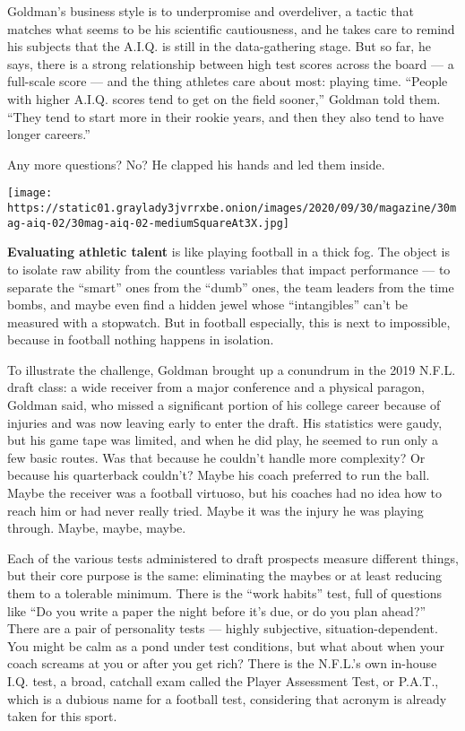 Goldman's business style is to underpromise and overdeliver, a tactic
that matches what seems to be his scientific cautiousness, and he takes
care to remind his subjects that the A.I.Q. is still in the
data-gathering stage. But so far, he says, there is a strong
relationship between high test scores across the board --- a full-scale
score --- and the thing athletes care about most: playing time. ``People
with higher A.I.Q. scores tend to get on the field sooner,'' Goldman
told them. ``They tend to start more in their rookie years, and then
they also tend to have longer careers.''

Any more questions? No? He clapped his hands and led them inside.

\texttt{[image: https://static01.graylady3jvrrxbe.onion/images/2020/09/30/magazine/30mag-aiq-02/30mag-aiq-02-mediumSquareAt3X.jpg]}

\textbf{Evaluating athletic talent} is like playing football in a thick
fog. The object is to isolate raw ability from the countless variables
that impact performance --- to separate the ``smart'' ones from the
``dumb'' ones, the team leaders from the time bombs, and maybe even find
a hidden jewel whose ``intangibles'' can't be measured with a stopwatch.
But in football especially, this is next to impossible, because in
football nothing happens in isolation.

To illustrate the challenge, Goldman brought up a conundrum in the 2019
N.F.L. draft class: a wide receiver from a major conference and a
physical paragon, Goldman said, who missed a significant portion of his
college career because of injuries and was now leaving early to enter
the draft. His statistics were gaudy, but his game tape was limited, and
when he did play, he seemed to run only a few basic routes. Was that
because he couldn't handle more complexity? Or because his quarterback
couldn't? Maybe his coach preferred to run the ball. Maybe the receiver
was a football virtuoso, but his coaches had no idea how to reach him or
had never really tried. Maybe it was the injury he was playing through.
Maybe, maybe, maybe.

Each of the various tests administered to draft prospects measure
different things, but their core purpose is the same: eliminating the
maybes or at least reducing them to a tolerable minimum. There is the
``work habits'' test, full of questions like ``Do you write a paper the
night before it's due, or do you plan ahead?'' There are a pair of
personality tests --- highly subjective, situation-dependent. You might
be calm as a pond under test conditions, but what about when your coach
screams at you or after you get rich? There is the N.F.L.'s own in-house
I.Q. test, a broad, catchall exam called the Player Assessment Test, or
P.A.T., which is a dubious name for a football test, considering that
acronym is already taken for this sport.

